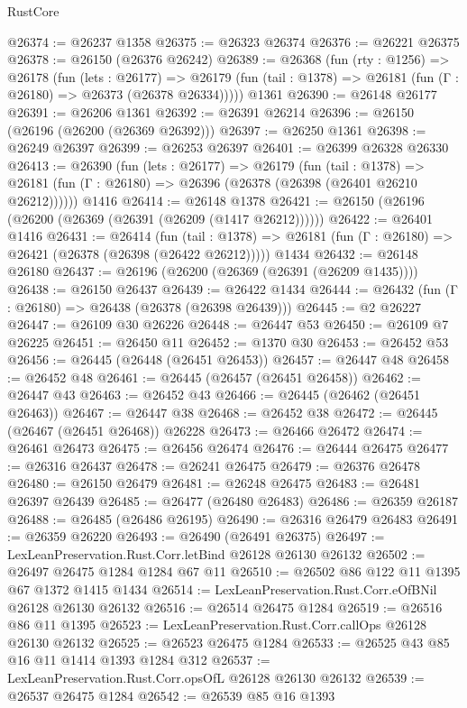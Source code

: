 \begin{lexlean}{RustCore}
\begin{coremodule}
@26374 := @26237 @1358
@26375 := @26323 @26374
@26376 := @26221 @26375
@26378 := @26150 (@26376 @26242)
@26389 := @26368
    (fun (rty : @1256) =>
    @26178
      (fun (lets : @26177) =>
      @26179 (fun (tail : @1378) => @26181 (fun (Γ : @26180) => @26373 (@26378 @26334)))))
    @1361
@26390 := @26148 @26177
@26391 := @26206 @1361
@26392 := @26391 @26214
@26396 := @26150 (@26196 (@26200 (@26369 @26392)))
@26397 := @26250 @1361
@26398 := @26249 @26397
@26399 := @26253 @26397
@26401 := @26399 @26328 @26330
@26413 := @26390
    (fun (lets : @26177) =>
    @26179
      (fun (tail : @1378) =>
      @26181 (fun (Γ : @26180) => @26396 (@26378 (@26398 (@26401 @26210 @26212))))))
    @1416
@26414 := @26148 @1378
@26421 := @26150 (@26196 (@26200 (@26369 (@26391 (@26209 (@1417 @26212))))))
@26422 := @26401 @1416
@26431 := @26414
    (fun (tail : @1378) => @26181 (fun (Γ : @26180) => @26421 (@26378 (@26398 (@26422 @26212)))))
    @1434
@26432 := @26148 @26180
@26437 := @26196 (@26200 (@26369 (@26391 (@26209 @1435))))
@26438 := @26150 @26437
@26439 := @26422 @1434
@26444 := @26432 (fun (Γ : @26180) => @26438 (@26378 (@26398 @26439)))
@26445 := @2 @26227
@26447 := @26109 @30 @26226
@26448 := @26447 @53
@26450 := @26109 @7 @26225
@26451 := @26450 @11
@26452 := @1370 @30
@26453 := @26452 @53
@26456 := @26445 (@26448 (@26451 @26453))
@26457 := @26447 @48
@26458 := @26452 @48
@26461 := @26445 (@26457 (@26451 @26458))
@26462 := @26447 @43
@26463 := @26452 @43
@26466 := @26445 (@26462 (@26451 @26463))
@26467 := @26447 @38
@26468 := @26452 @38
@26472 := @26445 (@26467 (@26451 @26468)) @26228
@26473 := @26466 @26472
@26474 := @26461 @26473
@26475 := @26456 @26474
@26476 := @26444 @26475
@26477 := @26316 @26437
@26478 := @26241 @26475
@26479 := @26376 @26478
@26480 := @26150 @26479
@26481 := @26248 @26475
@26483 := @26481 @26397 @26439
@26485 := @26477 (@26480 @26483)
@26486 := @26359 @26187
@26488 := @26485 (@26486 @26195)
@26490 := @26316 @26479 @26483
@26491 := @26359 @26220
@26493 := @26490 (@26491 @26375)
@26497 := LexLeanPreservation.Rust.Corr.letBind @26128 @26130 @26132
@26502 := @26497 @26475 @1284 @1284 @67 @11
@26510 := @26502 @86 @122 @11 @1395 @67 @1372 @1415 @1434
@26514 := LexLeanPreservation.Rust.Corr.eOfBNil @26128 @26130 @26132
@26516 := @26514 @26475 @1284
@26519 := @26516 @86 @11 @1395
@26523 := LexLeanPreservation.Rust.Corr.callOps @26128 @26130 @26132
@26525 := @26523 @26475 @1284
@26533 := @26525 @43 @85 @16 @11 @1414 @1393 @1284 @312
@26537 := LexLeanPreservation.Rust.Corr.opsOfL @26128 @26130 @26132
@26539 := @26537 @26475 @1284
@26542 := @26539 @85 @16 @1393

\end{coremodule}
\end{lexlean}
